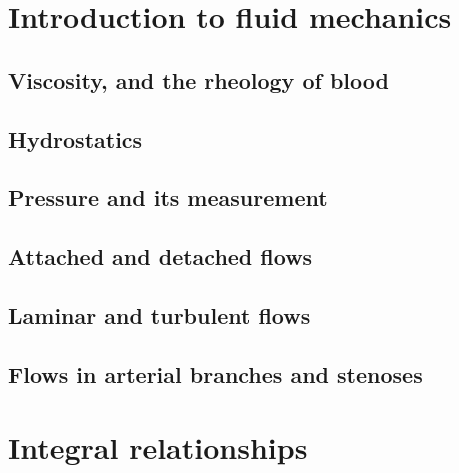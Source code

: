 \documentclass[a4paper,11pt]		{report}
\begin{document}
\chapter{Introduction to fluid mechanics}
\label{ch.intro}

\section{Viscosity, and the rheology of blood}

\section{Hydrostatics}

\section{Pressure and its measurement}

\section{Attached and detached flows}

\section{Laminar and turbulent flows}

\section{Flows in arterial branches and stenoses}




\chapter{Integral relationships}
\label{ch.integral}

\end{document}
